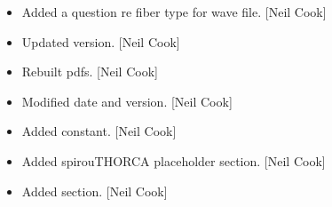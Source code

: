 \documentclass[a4paper,10pt,english]{report}
\begin{document}
\begin{itemize}
\item {} 
Added a question re fiber type for wave file. {[}Neil Cook{]}

\item {} 
Updated version. {[}Neil Cook{]}

\item {} 
Rebuilt pdfs. {[}Neil Cook{]}

\item {} 
Modified date and version. {[}Neil Cook{]}

\item {} 
Added  constant. {[}Neil Cook{]}

\item {} 
Added spirouTHORCA placeholder section. {[}Neil Cook{]}

\item {} 
Added  section. {[}Neil Cook{]}

\end{itemize}
\end{document}

